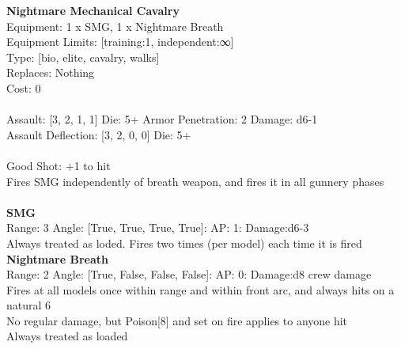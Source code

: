 {\bf Nightmare Mechanical Cavalry } \\
Equipment: 1 x SMG, 1 x Nightmare Breath \\
Equipment Limits: [training:1, independent:∞] \\
Type: [bio, elite, cavalry, walks] \\
Replaces: Nothing \\
Cost: 0\\
\ \\
Assault: [3, 2, 1, 1] Die: 5+ Armor Penetration: 2 Damage: d6-1 \\
Assault Deflection: [3, 2, 0, 0] Die: 5+\\
\indent  
\ \\
Good Shot: +1 to hit\\ 
Fires SMG independently of breath weapon, and fires it in all gunnery phases\\ 

\ \\
{\bf SMG } \\



Range: 3  Angle: [True, True, True, True]: AP: 1: Damage:d6-3 \\
Always treated as loded. Fires two times (per model) each time it is fired\\ 




{\bf Nightmare Breath } \\



Range: 2  Angle: [True, False, False, False]: AP: 0: Damage:d8 crew damage \\
Fires at all models once within range and within front arc, and always hits on a natural 6\\ 
No regular damage, but Poison[8] and set on fire applies to anyone hit\\ 
Always treated as loaded\\ 




 
\ \\



